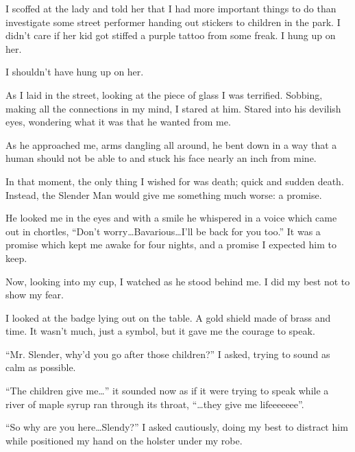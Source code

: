 I scoffed at the lady and told her that I had more important things
to do than investigate some street performer handing out stickers
to children in the park. I didn't care if her kid got stiffed
a purple tattoo from some freak. I hung up on her.



I shouldn't have hung up on her.



As I laid in the street, looking at the piece of glass I was
terrified. Sobbing, making all the connections in my mind, I stared
at him. Stared into his devilish eyes, wondering what it was that
he wanted from me.



As he approached me, arms dangling all around, he bent down in a
way that a human should not be able to and stuck his face nearly an
inch from mine.



In that moment, the only thing I wished for was death; quick and
sudden death. Instead, the Slender Man would give me something much
worse: a promise.



He looked me in the eyes and with a smile he whispered in a voice
which came out in chortles, ``Don't
worry{\ldots}Bavarious{\ldots}I'll be back for you
too.'' It was a promise which kept me awake for four nights,
and a promise I expected him to keep.



Now, looking into my cup, I watched as he stood behind me. I did my
best not to show my fear.



I looked at the badge lying out on the table. A gold shield made of
brass and time. It wasn't much, just a symbol, but it gave me
the courage to speak.



``Mr. Slender, why'd you go after those children?''
I asked, trying to sound as calm as possible.



``The children give me{\ldots}'' it sounded now as if it
were trying to speak while a river of maple syrup ran through its
throat, ``{\ldots}they give me lifeeeeeee''.



``So why are you here{\ldots}Slendy?'' I asked
cautiously, doing my best to distract him while positioned my hand
on the holster under my robe.



